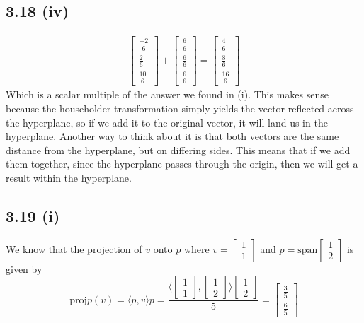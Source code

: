 \documentclass[letterpaper,12pt]{article}
\theoremstyle{definition}
\begin{document}
\subsection*{3.18 (iv)}
\begin{align*}
    \begin{bmatrix}
        \frac{-2}{6}\\\frac{2}{6}\\\frac{10}{6}
    \end{bmatrix}
    +
    \begin{bmatrix}
        \frac{6}{6}\\\frac{6}{6}\\\frac{6}{6}
    \end{bmatrix}
    = 
    \begin{bmatrix}
        \frac{4}{6}\\\frac{8}{6}\\\frac{16}{6}
    \end{bmatrix}
\end{align*}
Which is a scalar multiple of the answer we found in (i). This makes sense because the householder transformation simply yields the vector reflected across the hyperplane, so if we add it to the original vector, it will land us in the hyperplane. Another way to think about it is that both vectors are the same distance from the hyperplane, but on differing sides. This means that if we add them together, since the hyperplane passes through the origin, then we will get a result within the hyperplane.

\subsection*{3.19 (i)}
We know that the projection of $v$ onto $p$ where $v = 
\begin{bmatrix}
    1\\1
\end{bmatrix}
$ and $p = \text{span} 
\begin{bmatrix}
    1\\2
\end{bmatrix}
$ is given by 
\[ \text{proj}p(v) = \langle p,v \rangle p = 
\frac{
\langle 
\begin{bmatrix}
    1\\1
\end{bmatrix}
,
\begin{bmatrix}
    1\\2
\end{bmatrix}
\rangle
\begin{bmatrix}
    1\\2
\end{bmatrix}
}{5} = 
\begin{bmatrix}
    \frac{3}{5}\\\frac{6}{5}
\end{bmatrix}
\]
\end{document}
